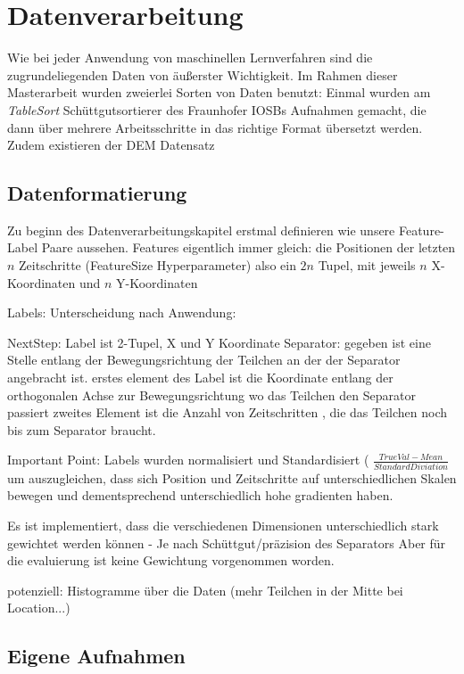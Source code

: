 \chapter{Datenverarbeitung}

Wie bei jeder Anwendung von maschinellen Lernverfahren sind die zugrundeliegenden Daten von äußerster Wichtigkeit.
Im Rahmen dieser Masterarbeit wurden zweierlei Sorten von Daten benutzt:
Einmal wurden am \textit{TableSort} Schüttgutsortierer des Fraunhofer IOSBs Aufnahmen gemacht, 
die dann über mehrere Arbeitsschritte in das richtige Format übersetzt werden.
Zudem existieren der DEM Datensatz 



\section{Datenformatierung}

Zu beginn des Datenverarbeitungskapitel erstmal definieren wie unsere Feature-Label Paare aussehen.
Features eigentlich immer gleich:
die Positionen der letzten \(n\) Zeitschritte (FeatureSize Hyperparameter)
also ein \(2n\) Tupel, mit jeweils \(n\) X-Koordinaten und \(n\) Y-Koordinaten


Labels: Unterscheidung nach Anwendung:

NextStep: Label ist 2-Tupel, X und Y Koordinate
Separator: 
	gegeben ist eine Stelle entlang der Bewegungsrichtung der Teilchen an der der Separator angebracht ist.
	erstes element des Label ist die Koordinate entlang der orthogonalen Achse zur Bewegungsrichtung wo das Teilchen den Separator passiert
	zweites Element ist die Anzahl von Zeitschritten , die das Teilchen noch bis zum Separator braucht.

Important Point: Labels wurden normalisiert und Standardisiert ( \(\frac{TrueVal - Mean}{Standard Diviation}\)
um auszugleichen, dass sich Position und Zeitschritte auf unterschiedlichen Skalen bewegen und dementsprechend unterschiedlich hohe gradienten haben.


Es ist implementiert, dass die verschiedenen Dimensionen unterschiedlich stark gewichtet werden können - Je nach Schüttgut/präzision des Separators
Aber für die evaluierung ist keine Gewichtung vorgenommen worden.

potenziell: Histogramme über die Daten (mehr Teilchen in der Mitte bei Location...)



\section{Eigene Aufnahmen}

